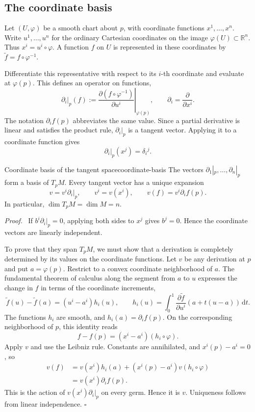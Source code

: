 \documentclass[11pt,a4paper]{article}
\numberwithin{equation}{section}
\newcommand{\R}{\mathbb R}
\newcommand{\dd}{\mathrm d}
\newcommand{\slidesref}[1]{\par\nobreak\smallskip\nobreak{\footnotesize\color{ink!60}\textsc{Source slides #1}}\par\nobreak\smallskip\nobreak}
\newcommand{\proofend}{\unskip\nobreak\hfill\(\square\)\par}
\newenvironment{proof}{\par\noindent\textit{Proof.}\ }{\proofend}
\begin{document}
\subsection{The coordinate basis}
\slidesref{9--10}

Let \((U,\varphi)\) be a smooth chart about \(p\), with coordinate
functions \(x^1,\ldots,x^n\). Write \(u^1,\ldots,u^n\) for the ordinary
Cartesian coordinates on the image \(\varphi(U)\subset\R^n\). Thus
\(x^i=u^i\circ\varphi\). A function \(f\) on \(U\) is represented in
these coordinates by \(\widetilde f=f\circ\varphi^{-1}\).

Differentiate this representative with respect to its \(i\)-th coordinate
and evaluate at \(\varphi(p)\). This defines an operator on functions,
\[
 \partial_i|_p(f)
 :=\left.
 \frac{\partial(f\circ\varphi^{-1})}{\partial u^i}
 \right|_{\varphi(p)},
 \qquad
 \partial_i=\frac{\partial}{\partial x^i}.
\]
The notation \(\partial_i f(p)\) abbreviates the same value. Since a
partial derivative is linear and satisfies the product rule,
\(\partial_i|_p\) is a tangent vector. Applying it to a coordinate
function gives
\[
 \partial_i|_p(x^j)=\delta_i{}^j.
\]

\begin{theorem}{Coordinate basis of the tangent space}{coordinate-basis}
The vectors \(\partial_1|_p,\ldots,\partial_n|_p\) form a basis of
\(T_pM\). Every tangent vector has a unique expansion
\begin{equation}
 v=v^i\partial_i|_p,\qquad v^i=v(x^i),\qquad
 v(f)=v^i\partial_i f(p).
 \label{eq:tangent-components}
\end{equation}
In particular, \(\dim T_pM=\dim M=n\).
\end{theorem}

\begin{proof}
If \(b^i\partial_i|_p=0\), applying both sides to \(x^j\) gives
\(b^j=0\). Hence the coordinate vectors are linearly independent.

To prove that they span \(T_pM\), we must show that a derivation is
completely determined by its values on the coordinate functions.
Let \(v\) be any derivation at \(p\) and put \(a=\varphi(p)\).
Restrict to a convex coordinate neighborhood of \(a\). The fundamental
theorem of calculus along the segment from \(a\) to \(u\) expresses
the change in \(f\) in terms of the coordinate increments,
\[
 \widetilde f(u)-\widetilde f(a)=(u^i-a^i)h_i(u),\qquad
 h_i(u)=\int_0^1
 \frac{\partial\widetilde f}{\partial u^i}(a+t(u-a))\,\dd t.
\]
The functions \(h_i\) are smooth, and \(h_i(a)=\partial_i f(p)\).
On the corresponding neighborhood of \(p\), this identity reads
\[
 f-f(p)=(x^i-a^i)(h_i\circ\varphi).
\]
Apply \(v\) and use the Leibniz rule. Constants are annihilated, and
\(x^i(p)-a^i=0\), so
\[
 \begin{aligned}
 v(f)
 &=v(x^i)h_i(a)+(x^i(p)-a^i)v(h_i\circ\varphi)\\
 &=v(x^i)\partial_i f(p).
 \end{aligned}
\]
This is the action of \(v(x^i)\partial_i|_p\) on every germ. Hence it is
\(v\). Uniqueness follows from linear independence.
\end{proof}
\end{document}
